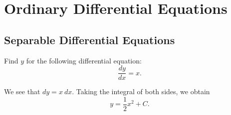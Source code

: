 \chapter{Ordinary Differential Equations}
\section{Separable Differential Equations}

\begin{example}
    Find $y$ for the following differential equation:
    $$\frac{dy}{dx} = x.$$
\end{example}
\begin{soln}
    We see that $dy = x ~ dx$. Taking the integral of both sides, we obtain
    $$y = \frac{1}{2} x^2 + C.$$
\end{soln}

